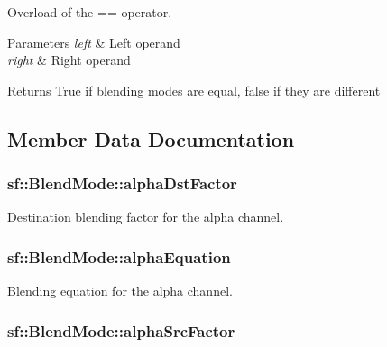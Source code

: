 Overload of the == operator. 


\begin{DoxyParams}{Parameters}
{\em left} & Left operand \\
\hline
{\em right} & Right operand\\
\hline
\end{DoxyParams}
\begin{DoxyReturn}{Returns}
True if blending modes are equal, false if they are different 
\end{DoxyReturn}


\subsection{Member Data Documentation}
\hypertarget{structsf_1_1_blend_mode_aaf85b6b7943181cc81745569c4851e4e}{
\subsubsection[{alpha\-Dst\-Factor}]{ sf\-::\-Blend\-Mode\-::alpha\-Dst\-Factor}}\label{structsf_1_1_blend_mode_aaf85b6b7943181cc81745569c4851e4e}


Destination blending factor for the alpha channel. 

\hypertarget{structsf_1_1_blend_mode_a68f5a305e0912946f39ba6c9265710c4}{
\subsubsection[{alpha\-Equation}]{ sf\-::\-Blend\-Mode\-::alpha\-Equation}}\label{structsf_1_1_blend_mode_a68f5a305e0912946f39ba6c9265710c4}


Blending equation for the alpha channel. 

\hypertarget{structsf_1_1_blend_mode_aa94e44f8e1042a7357e8eff78c61a1be}{
\subsubsection[{alpha\-Src\-Factor}]{ sf\-::\-Blend\-Mode\-::alpha\-Src\-Factor}}\label{structsf_1_1_blend_mode_aa94e44f8e1042a7357e8eff78c61a1be}


